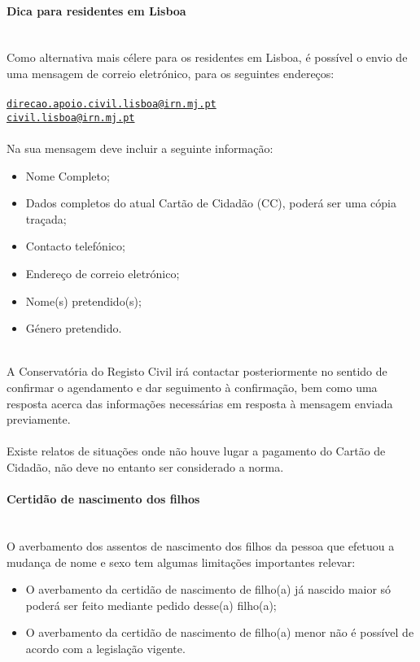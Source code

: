 \newpage

\paragraph{Dica para residentes em Lisboa}
\leavevmode\\
Como alternativa mais célere para os residentes em Lisboa, é possível o
envio de uma mensagem de correio eletrónico, para os seguintes
endereços:\\
\\
\href{mailto:direcao.apoio.civil.lisboa@irn.mj.pt}{\nolinkurl{direcao.apoio.civil.lisboa@irn.mj.pt}} \\
\href{mailto:civil.lisboa@irn.mj.pt}{\nolinkurl{civil.lisboa@irn.mj.pt}}
\\
\leavevmode\\
Na sua mensagem deve incluir a seguinte informação:
\begin{itemize}
	\item Nome Completo;
	\item Dados completos do atual Cartão de Cidadão (CC), poderá ser uma cópia
	traçada;
	\item Contacto telefónico;
	\item Endereço de correio eletrónico;
	\item Nome(s) pretendido(s);
	\item Género pretendido.
\end{itemize}
\leavevmode\\
A Conservatória do Registo Civil irá contactar posteriormente no sentido
de confirmar o agendamento e dar seguimento à confirmação, bem como uma
resposta acerca das informações necessárias em resposta à mensagem
enviada previamente. \\
\\
Existe relatos de situações onde não houve lugar a pagamento do Cartão
de Cidadão, não deve no entanto ser considerado a norma.

\paragraph{Certidão de nascimento dos filhos}
\leavevmode\\
O averbamento dos assentos de nascimento dos filhos da pessoa que
efetuou a mudança de nome e sexo tem algumas limitações importantes
relevar:
\begin{itemize}
	\item O averbamento da certidão de nascimento de filho(a) já nascido maior só poderá ser feito mediante pedido desse(a) filho(a);
	\item O averbamento da certidão de nascimento de filho(a) menor não é possível de acordo com a legislação vigente.
\end{itemize}

